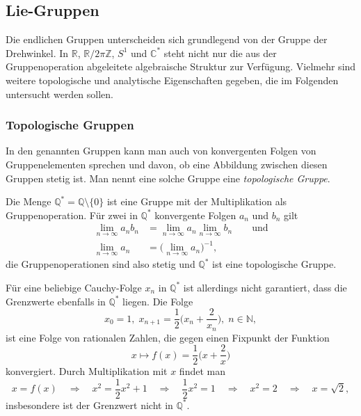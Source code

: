 %
%
%

%
%
\subsection{Lie-Gruppen
\label{buch:gruppen:subsection:lie-gruppen}}
Die endlichen Gruppen unterscheiden sich grundlegend von der Gruppe
der Drehwinkel.
In $\mathbb{R}$, $\mathbb{R}/2\pi\mathbb{Z}$, $S^1$ und $\mathbb{C}^*$
steht nicht nur die aus der Gruppenoperation abgeleitete algebraische
Struktur zur Verfügung.
Vielmehr sind weitere topologische und analytische Eigenschaften 
gegeben, die im Folgenden untersucht werden sollen.

%
%
\subsubsection{Topologische Gruppen}
In den genannten Gruppen kann man auch von konvergenten Folgen
von Gruppenelementen
sprechen und davon, ob eine Abbildung zwischen diesen Gruppen
stetig ist.
Man nennt eine solche Gruppe eine {\em topologische Gruppe}.
%

\begin{beispiel}
Die Menge
\(
\mathbb{Q}^*
=
\mathbb{Q} \setminus\{0\}
\)
ist eine Gruppe mit der Multiplikation als Gruppenoperation.
Für zwei in $\mathbb{Q}^*$ konvergente Folgen $a_n$ und $b_n$ gilt
\begin{align*}
\lim_{n\to\infty} a_nb_n
&=
\lim_{n\to\infty} a_n
\lim_{n\to\infty} b_n
\qquad\text{und}
\\
\lim_{n\to\infty} a_n
&=
\bigl(
\lim_{n\to\infty} a_n
\bigr)^{-1},
\end{align*}
die Gruppenoperationen sind also stetig und $\mathbb{Q}^*$
ist eine topologische Gruppe.

Für eine beliebige Cauchy-Folge $x_n$ in $\mathbb{Q}^*$
ist allerdings nicht garantiert, dass die Grenzwerte ebenfalls
in $\mathbb{Q}^*$ liegen.
Die Folge
\[
x_0=1,\;
x_{n+1} = \frac12\biggl(x_n+\frac{2}{x_n}\biggr),\; n\in\mathbb{N},
\]
ist eine Folge von rationalen Zahlen, die gegen einen Fixpunkt der
Funktion
\[
x\mapsto f(x)=\frac12\biggl(x+\frac{2}{x}\biggr)
\]
konvergiert.
Durch Multiplikation mit $x$ findet man
\[
x=f(x)
\quad\Rightarrow\quad
x^2=\frac12 x^2 + 1
\quad\Rightarrow\quad
\frac12x^2=1
\quad\Rightarrow\quad
x^2=2
\quad\Rightarrow\quad
x=\!\sqrt{2},
\]
insbesondere ist der Grenzwert nicht in $\mathbb{Q}^*$.
\end{beispiel}

